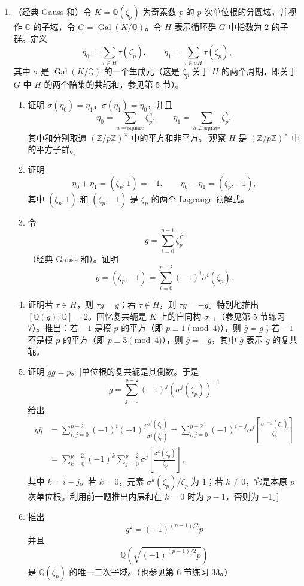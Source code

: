\begin{enumerate}[label=\arabic*.]
\item （经典 Gauss 和）令 $K=\mathbb Q(\zeta_p)$ 为奇素数 $p$ 的 $p$ 次单位根的分圆域，并视作 $\mathbb C$ 的子域，令 $G=\operatorname{Gal}(K/\mathbb Q)$。令 $H$ 表示循环群 $G$ 中指数为 $2$ 的子群。定义
\[
\eta_0=\sum_{\tau\in H}\tau(\zeta_p),
\qquad
\eta_1=\sum_{\tau\in \sigma H}\tau(\zeta_p),
\]
其中 $\sigma$ 是 $\operatorname{Gal}(K/\mathbb Q)$ 的一个生成元（这是 $\zeta_p$ 关于 $H$ 的两个周期，即关于 $G$ 中 $H$ 的两个陪集的共轭和，参见第 5 节）。
\begin{enumerate}[label=(\alph*)]
\item 证明 $\sigma(\eta_0)=\eta_1$，$\sigma(\eta_1)=\eta_0$，并且
\[
\eta_0=\sum_{a=\text{square}}\zeta_p^a,
\qquad
\eta_1=\sum_{b\neq\text{square}}\zeta_p^b,
\]
其中和分别取遍 $(\mathbb Z/p\mathbb Z)^\times$ 中的平方和非平方。[观察 $H$ 是 $(\mathbb Z/p\mathbb Z)^\times$ 中的平方子群。]
\item 证明
\[
\eta_0+\eta_1=(\zeta_p,1)=-1,
\qquad
\eta_0-\eta_1=(\zeta_p,-1),
\]
其中 $(\zeta_p,1)$ 和 $(\zeta_p,-1)$ 是 $\zeta_p$ 的两个 Lagrange 预解式。
\item 令
\[
g=\sum_{i=0}^{p-1}\zeta_p^{i^2}
\]
（经典 Gauss 和）。证明
\[
g=(\zeta_p,-1)=\sum_{i=0}^{p-2}(-1)^i\sigma^i(\zeta_p).
\]
\item 证明若 $\tau\in H$，则 $\tau g=g$；若 $\tau\notin H$，则 $\tau g=-g$。特别地推出 $[\mathbb Q(g):\mathbb Q]=2$。回忆复共轭是 $K$ 上的自同构 $\sigma_{-1}$（参见第 5 节练习 7）。推出：若 $-1$ 是模 $p$ 的平方（即 $p\equiv1\pmod4$），则 $\overline g=g$；若 $-1$ 不是模 $p$ 的平方（即 $p\equiv3\pmod4$），则 $\overline g=-g$，其中 $\overline g$ 表示 $g$ 的复共轭。
\item 证明 $g\overline g=p$。[单位根的复共轭是其倒数。于是
\[
\overline g=\sum_{j=0}^{p-2}(-1)^j(\sigma^j(\zeta_p))^{-1}
\]
给出
\[
\begin{aligned}
g\overline g
&=\sum_{i,j=0}^{p-2}(-1)^i(-1)^j\frac{\sigma^i(\zeta_p)}{\sigma^j(\zeta_p)}
=\sum_{i,j=0}^{p-2}(-1)^{i-j}\sigma^j\left[\frac{\sigma^{i-j}(\zeta_p)}{\zeta_p}\right]\\
&=\sum_{k=0}^{p-2}(-1)^k\sum_{j=0}^{p-2}\sigma^j\left[\frac{\sigma^k(\zeta_p)}{\zeta_p}\right],
\end{aligned}
\]
其中 $k=i-j$。若 $k=0$，元素 $\sigma^k(\zeta_p)/\zeta_p$ 为 $1$；若 $k\neq0$，它是本原 $p$ 次单位根。利用前一题推出内层和在 $k=0$ 时为 $p-1$，否则为 $-1$。]
\item 推出
\[
g^2=(-1)^{(p-1)/2}p
\]
并且
\[
\mathbb Q\left(\sqrt{(-1)^{(p-1)/2}p}\right)
\]
是 $\mathbb Q(\zeta_p)$ 的唯一二次子域。（也参见第 6 节练习 33。）
\end{enumerate}


\end{enumerate}
